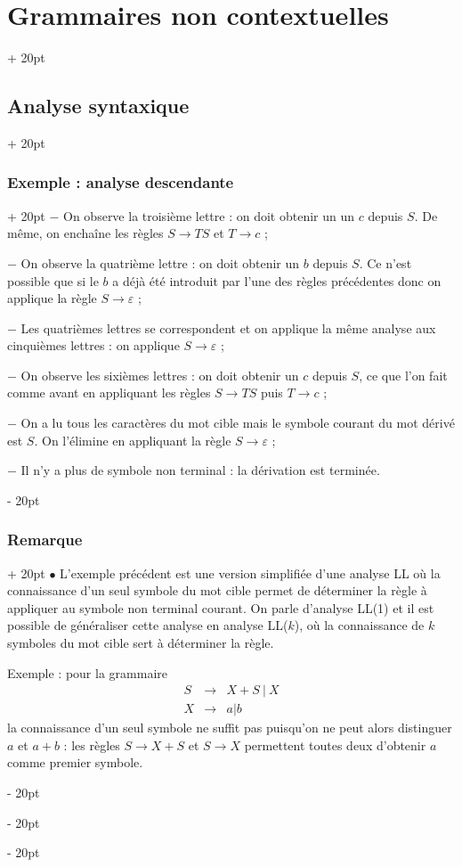 \documentclass[a4paper, 12pt, twoside]{article}
\newcommand{\ind}[1][20pt]{\advance\leftskip + #1}
\newcommand{\deind}[1][20pt]{\advance\leftskip - #1}
\newenvironment{indt}[2][20pt]{#2 \par \ind[#1]}{\par \deind} %
\begin{document}
\begin{indt}{\section{Grammaires non contextuelles}}
\begin{indt}{\subsection{Analyse syntaxique}}
\begin{indt}{\subsubsection{Exemple : analyse descendante}}
                $-$ On observe la troisième lettre : on doit obtenir un un $c$ depuis $S$. De même, on enchaîne les règles $S \rightarrow TS$ et $T \rightarrow c$ ;

                $-$ On observe la quatrième lettre : on doit obtenir un $b$ depuis $S$. Ce n'est possible que si le $b$ a déjà été introduit par l'une des règles précédentes donc on applique la règle $S \rightarrow \varepsilon$ ;

                $-$ Les quatrièmes lettres se correspondent et on applique la même analyse aux cinquièmes lettres : on applique $S \rightarrow \varepsilon$ ;

                $-$ On observe les sixièmes lettres : on doit obtenir un $c$ depuis $S$, ce que l'on fait comme avant en appliquant les règles $S \rightarrow TS$ puis $T \rightarrow c$ ;

                $-$ On a lu tous les caractères du mot cible mais le symbole courant du mot dérivé est $S$. On l'élimine en appliquant la règle $S \rightarrow \varepsilon$ ;

                $-$ Il n'y a plus de symbole non terminal : la dérivation est terminée.
            \end{indt}

            \vspace{12pt}
            
            \begin{indt}{\subsubsection{Remarque}}
                $\bullet$ L'exemple précédent est une version simplifiée d'une analyse LL où la connaissance d'un seul symbole du mot cible permet de déterminer la règle à appliquer au symbole non terminal courant.
                On parle d'analyse LL(1) et il est possible de généraliser cette analyse en analyse LL($k$), où la connaissance de $k$ symboles du mot cible sert à déterminer la règle.

                \vspace{6pt}
                
                Exemple : pour la grammaire
                \[
                    \begin{array}{rcl}
                        S & \rightarrow & X + S \ |\ X
                        \\
                        X & \rightarrow & a | b
                    \end{array}
                \]
                la connaissance d'un seul symbole ne suffit pas puisqu'on ne peut alors distinguer $a$ et $a + b$ : les règles $S \rightarrow X + S$ et $S \rightarrow X$ permettent toutes deux d'obtenir $a$ comme premier symbole.


\end{indt}
\end{indt}
\end{indt}
\end{document}
